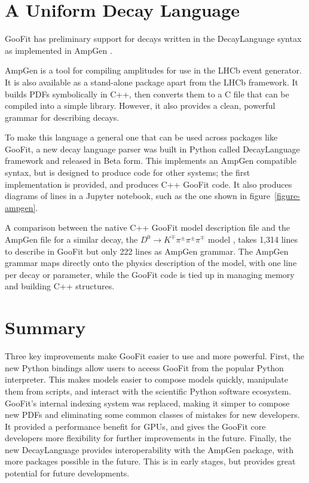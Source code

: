 \documentclass{webofc}
\begin{document}
\section{A Uniform Decay Language}
\label{sec-ampgen}

GooFit has preliminary support for decays written in the DecayLanguage syntax as implemented in AmpGen \cite{lib:AmpGen}.

AmpGen is a tool for compiling amplitudes for use in the LHCb event generator. It is also available as a stand-alone package apart from the LHCb framework. It builds PDFs symbolically in C++, then converts them to a C file that can be compiled into a simple library. However, it also provides a clean, powerful grammar for describing decays.

To make this language a general one that can be used across packages like GooFit, a new decay language parser was built in Python called DecayLanguage framework and released in Beta form. This implements an AmpGen compatible syntax, but is designed to produce code for other systems; the first implementation is provided, and produces C++ GooFit code. It also produces diagrams of lines in a Jupyter notebook, such as the one shown in figure~\ref{figure-ampgen}.

A comparison between the native C++ GooFit model description file and the AmpGen file for a similar decay, the  $D^0\rightarrow K^{\mp} \pi^{\pm} \pi^{\pm} \pi^{\mp}$ model \cite{paper:kthreepi}, takes 1,314 lines to describe in GooFit but only 222 lines as AmpGen grammar. The AmpGen grammar maps directly onto the physics description of the model, with one line per decay or parameter, while the GooFit code is tied up in managing memory and building C++ structures.



\section{Summary}
\label{sec-summary}

Three key improvements make GooFit easier to use and more powerful. First, the new Python bindings allow users to access GooFit from the popular Python interpreter. This makes models easier to compose models quickly, manipulate them from scripts, and interact with the scientific Python software ecosystem.
GooFit's internal indexing system was replaced, making it simper to compose new PDFs and eliminating some common classes of mistakes for new developers. It provided a performance benefit for GPUs, and gives the GooFit core developers more flexibility for further improvements in the future.
Finally, the new DecayLanguage provides interoperability with the AmpGen package, with more packages possible in the future. This is in early stages, but provides great potential for future developments.
\end{document}
